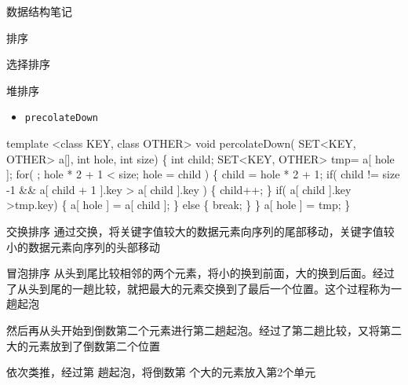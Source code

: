 \documentclass[
  ignorenonframetext,
]{beamer}
\newenvironment{Shaded}{}{}
\newcommand{\NormalTok}[1]{#1}
\providecommand{\tightlist}{%
  \setlength{\itemsep}{0pt}\setlength{\parskip}{0pt}}
\begin{document}
\begin{frame}[fragile]{数据结构笔记}
\begin{block}{排序}
\begin{block}{选择排序}
\begin{block}{堆排序}
\begin{itemize}
\tightlist
\item
  \texttt{precolateDown}
\end{itemize}

\begin{Shaded}
\begin{Highlighting}[]
\NormalTok{template \textless{}class KEY, class OTHER\textgreater{}}
\NormalTok{void percolateDown( SET\textless{}KEY, OTHER\textgreater{} a[], int hole, int size)}
\NormalTok{\{}
\NormalTok{  int child;}
\NormalTok{  SET\textless{}KEY, OTHER\textgreater{} tmp= a[ hole ];}
\NormalTok{  for( ; hole * 2 + 1 \textless{} size; hole = child )}
\NormalTok{  \{}
\NormalTok{    child = hole * 2 + 1;}
\NormalTok{    if( child != size {-}1 \&\& a[ child + 1 ].key \textgreater{} a[ child ].key )}
\NormalTok{    \{}
\NormalTok{      child++;}
\NormalTok{    \}}
\NormalTok{    if( a[ child ].key \textgreater{}tmp.key)}
\NormalTok{    \{}
\NormalTok{      a[ hole ] = a[ child ];}
\NormalTok{    \}}
\NormalTok{    else}
\NormalTok{    \{}
\NormalTok{      break;}
\NormalTok{    \}}
\NormalTok{  \}}
\NormalTok{  a[ hole ] = tmp;}
\NormalTok{\}}
\end{Highlighting}
\end{Shaded}
\end{block}
\end{block}

\begin{block}{交换排序}
\protect{}\label{ux4ea4ux6362ux6392ux5e8f}
通过交换，将关键字值较大的数据元素向序列的尾部移动，关键字值较小的数据元素向序列的头部移动

\begin{block}{冒泡排序}
\protect{}\label{ux5192ux6ce1ux6392ux5e8f}
从头到尾比较相邻的两个元素，将小的换到前面，大的换到后面。经过了从头到尾的一趟比较，就把最大的元素交换到了最后一个位置。这个过程称为一趟起泡

然后再从头开始到倒数第二个元素进行第二趟起泡。经过了第二趟比较，又将第二大的元素放到了倒数第二个位置

依次类推，经过第 {} 趟起泡，将倒数第 {} 个大的元素放入第2个单元


\end{block}
\end{block}
\end{block}
\end{frame}
\end{document}
